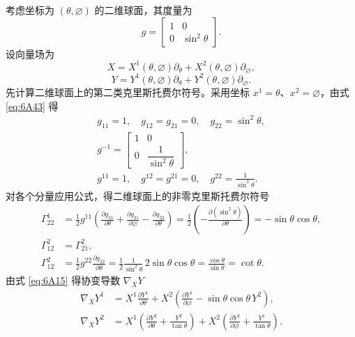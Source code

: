 考虑坐标为 $(\theta,\varnothing)$ 的二维球面，其度量为
\begin{equation*}
  g=\begin{bmatrix}1&0\\0&\sin^2\theta\end{bmatrix}.
  \tag{6A43}\label{eq:6A43}
\end{equation*}
设向量场为
\begin{equation*}
  X=X^1(\theta,\varnothing)\partial_\theta+X^2(\theta,\varnothing)\partial_\varnothing,
  \tag{6A44}\label{eq:6A44}
\end{equation*}
\begin{equation*}
  Y=Y^1(\theta,\varnothing)\partial_\theta+Y^2(\theta,\varnothing)\partial_\varnothing.
  \tag{6A45}\label{eq:6A45}
\end{equation*}
先计算二维球面上的第二类克里斯托费尔符号。采用坐标 $x^1=\theta$、$x^2=\varnothing$，由式 \eqref{eq:6A43} 得
\begin{gather*}
  g_{11}=1,\quad g_{12}=g_{21}=0,\quad g_{22}=\sin^2\theta,\\
  g^{-1}=\begin{bmatrix}1&0\\0&\dfrac{1}{\sin^2\theta}\end{bmatrix},\\
  g^{11}=1,\quad g^{12}=g^{21}=0,\quad g^{22}=\frac{1}{\sin^2\theta}.
\end{gather*}
对各个分量应用公式，得二维球面上的非零克里斯托费尔符号
\begin{align*}
  \Gamma^1_{22}
    &=\frac12g^{11}\left(\frac{\partial g_{21}}{\partial\theta}
        +\frac{\partial g_{21}}{\partial\varnothing}
        -\frac{\partial g_{22}}{\partial\theta}\right)
      =\frac12\left(-\frac{\partial(\sin^2\theta)}{\partial\theta}\right)
      =-\sin\theta\cos\theta,\\
  \Gamma^2_{12}&=\Gamma^2_{21},\\
  \Gamma^2_{12}&=\frac12g^{22}\frac{\partial g_{22}}{\partial\theta}
    =\frac12\frac{1}{\sin^2\theta}\,2\sin\theta\cos\theta
    =\frac{\cos\theta}{\sin\theta}=\cot\theta.
\end{align*}
由式 \eqref{eq:6A15} 得协变导数 $\nabla_XY$
\begin{align*}
  \nabla_XY^1&=X^1\frac{\partial Y^1}{\partial\theta}
      +X^2\left(\frac{\partial Y^1}{\partial\varnothing}
        -\sin\theta\cos\theta\,Y^2\right),\\
  \nabla_XY^2&=X^1\left(\frac{\partial Y^2}{\partial\theta}+\frac{Y^2}{\tan\theta}\right)
      +X^2\left(\frac{\partial Y^2}{\partial\varnothing}+\frac{Y^1}{\tan\theta}\right).
\end{align*}

